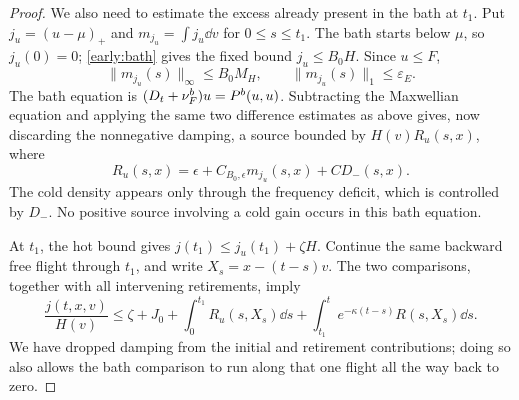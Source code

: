 \begin{proof}
We also need to estimate the excess already present in the bath at
$t_1$.  Put $j_u=(u-\mu)_+$ and $m_{j_u}=\int j_u\dd v$ for
$0\le s\le t_1$.  The bath starts below $\mu$, so $j_u(0)=0$;
\cref{early:bath} gives the fixed bound $j_u\le B_0H$.
Since $u\le F$,
\begin{equation}\label{global:bath-excess-mass}
 \|m_{j_u}(s)\|_\infty\le B_0M_H,
 \qquad\|m_{j_u}(s)\|_1\le\varepsilon_E.
\end{equation}
The bath equation is $(D_t+\nu_F^b)u=P^b(u,u)$.  Subtracting the
Maxwellian equation and applying the same two difference estimates as
above gives, now discarding the nonnegative damping, a source bounded
by $H(v)R_u(s,x)$, where
\begin{equation}\label{global:bath-excess-source}
 R_u(s,x)=\epsilon+C_{B_0,\epsilon}m_{j_u}(s,x)+CD_-(s,x).
\end{equation}
The cold density appears only through the frequency deficit, which is
controlled by $D_-$.  No positive source involving a cold gain occurs
in this bath equation.

At $t_1$, the hot bound gives $j(t_1)\le j_u(t_1)+\zeta H$.
Continue the same backward free flight through $t_1$, and write
$X_s=x-(t-s)v$.  The two comparisons, together with all intervening
retirements, imply
\begin{equation}\label{global:excess-path}
 \frac{j(t,x,v)}{H(v)}
 \le\zeta+J_0
   +\int_0^{t_1}R_u(s,X_s)\dd s
   +\int_{t_1}^t e^{-\kappa(t-s)}R(s,X_s)\dd s.
\end{equation}
We have dropped damping from the initial and retirement contributions;
doing so also allows the bath comparison to run along that one flight
all the way back to zero.


\end{proof}
